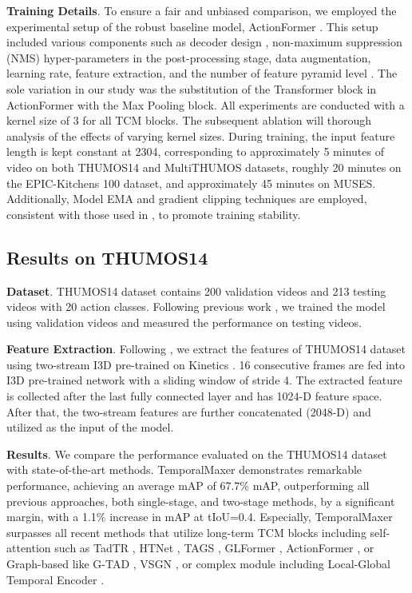 \documentclass[10pt,twocolumn,letterpaper]{article}
\begin{document}
\textbf{Training Details}. To ensure a fair and unbiased comparison, we employed the experimental setup of the robust baseline model, ActionFormer \cite{zhang2022actionformer}. This setup included various components such as decoder design , non-maximum suppression (NMS) hyper-parameters in the post-processing stage, data augmentation, learning rate, feature extraction, and the number of feature pyramid level . The sole variation in our study was the substitution of the Transformer block in ActionFormer with the Max Pooling block. All experiments are conducted with a kernel size of 3 for all TCM blocks. The subsequent ablation  will thorough analysis of the effects of varying kernel sizes. During training, the input feature length is kept constant at 2304, corresponding to approximately 5 minutes of video on both THUMOS14 and MultiTHUMOS datasets, roughly 20 minutes on the EPIC-Kitchens 100 dataset, and approximately 45 minutes on MUSES. Additionally, Model EMA \cite{huang2017snapshot} and gradient clipping techniques are employed, consistent with those used in \cite{zhang2022actionformer}, to promote training stability.

\subsection{Results on THUMOS14}

\textbf{Dataset}. THUMOS14 dataset \cite{idrees2017thumos} contains 200 validation videos and 213 testing videos with 20 action classes. Following previous work \cite{lin2019bmn, lin2018bsn, xu2020g, zhao2020bottom, zhang2022actionformer}, we trained the model using validation videos and measured the performance on testing videos.

\textbf{Feature Extraction}. Following \cite{zhang2022actionformer, zhao2020bottom}, we extract the features of THUMOS14 dataset using two-stream I3D \cite{carreira2017quo} pre-trained on Kinetics \cite{kay2017kinetics}. 16 consecutive frames are fed into I3D pre-trained network with a sliding window of stride 4. The extracted feature is collected after the last fully connected layer and has 1024-D feature space. After that, the two-stream features are further concatenated (2048-D) and utilized as the input of the model.

\textbf{Results}. We compare the performance
evaluated on the THUMOS14 dataset \cite{idrees2017thumos} with state-of-the-art methods. TemporalMaxer demonstrates remarkable performance, achieving an average mAP of 67.7\% mAP, outperforming all previous approaches, both single-stage, and two-stage methods, by a significant margin, with a 1.1\% increase in mAP at tIoU=0.4.
Especially, TemporalMaxer surpasses all recent methods that utilize long-term TCM blocks including self-attention such as TadTR \cite{liu2022end}, HTNet \cite{kang2022htnet}, TAGS \cite{nag2022proposal}, GLFormer \cite{he2022glformer}, ActionFormer \cite{zhang2022actionformer}, or Graph-based like G-TAD \cite{xu2020g}, VSGN \cite{zhao2021video}, or complex module including Local-Global Temporal Encoder \cite{qing2021temporal}.
\end{document}
